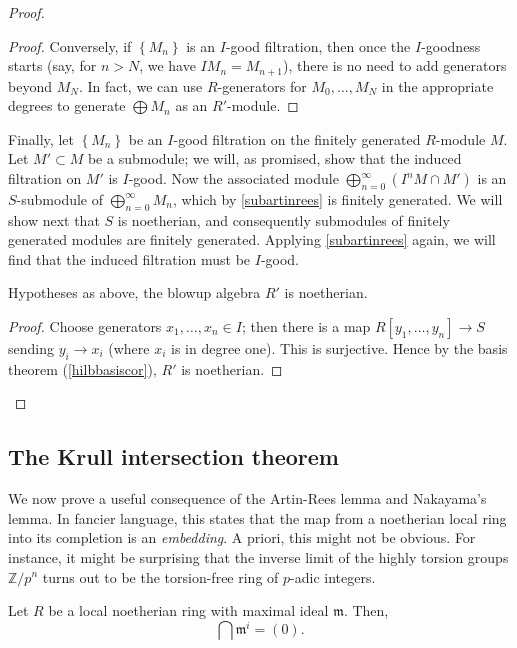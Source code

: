 \begin{proof}
\begin{proof}
Conversely, if $\left\{M_n\right\}$ is an $I$-good filtration, then once the
$I$-goodness starts (say, for $n>N$, we have $IM_{n} = M_{n+1}$), there is no
need to add generators beyond $M_{N}$. In fact, we can use $R$-generators for
$M_0, \dots, M_N$ in the appropriate degrees to generate $\bigoplus M_n$ as an
$R'$-module.
\end{proof}

Finally, let $\left\{M_n\right\}$ be an $I$-good filtration on the finitely
generated $R$-module $M$. Let $M' \subset M$ be a submodule; we will, as
promised, show that the  induced filtration on $M'$ is $I$-good.
Now the associated module $\bigoplus_{n=0}^{\infty} (I^n M \cap M') $
is an $S$-submodule of $\bigoplus_{n=0}^{\infty} M_n$, which
by \cref{subartinrees} is finitely generated. We will show next that $S$
is noetherian, and consequently submodules of finitely generated
modules are finitely generated. Applying \cref{subartinrees} again, we will find
that the induced filtration must be $I$-good.

\begin{lemma} 
Hypotheses as above,  the blowup algebra $R'$ is noetherian.
\end{lemma} 
\begin{proof} 
Choose generators $x_1, \dots, x_n \in I$; then there is a map $R[y_1, \dots,
y_n] \to S$ sending $y_i \to x_i $ (where $x_i$ is in degree one). This is surjective. Hence by the basis
theorem (\cref{hilbbasiscor}), $R'$ is noetherian.
\end{proof} 


\end{proof} 


\subsection{The Krull intersection theorem}

We now prove a useful consequence of the Artin-Rees lemma and Nakayama's
lemma. In fancier language, this states that the map from a noetherian local
ring into its
completion is an \emph{embedding}. A priori, this might not be obvious. For
instance, it might be surprising that the inverse limit of the highly torsion
groups $\mathbb{Z}/p^n$ turns out to be the torsion-free ring of $p$-adic
integers.

\begin{theorem} \label{krullint} Let $R$ be a local noetherian ring with maximal ideal
$\mathfrak{m}$. Then,
\[ \bigcap \mathfrak{m}^i = (0).  \]
\end{theorem} 

